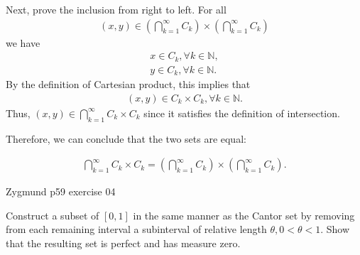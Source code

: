 \documentclass[UTF8,a4paper,10pt]{article}
\begin{document}
\begin{solution}
    Next, prove the inclusion from right to left. For all
    \begin{equation*}
      \begin{aligned}
          (x,y)\in \left(\bigcap_{k=1}^{\infty} C_k\right) \times \left(\bigcap_{k=1}^{\infty} C_k\right)
      \end{aligned}
    \end{equation*}
    we have
    \begin{equation*}
      \begin{aligned}
        x\in C_k, \forall k \in \mathbb{N},\\
        y\in C_k, \forall k \in \mathbb{N}.
      \end{aligned}
    \end{equation*}
    By the definition of Cartesian product, this implies that
    \begin{equation*}
      \begin{aligned}
        (x,y)\in C_k \times C_k, \forall k \in \mathbb{N}.
      \end{aligned}
    \end{equation*}
    Thus, \((x,y)\in \bigcap_{k=1}^{\infty} C_k \times C_k \)  since it satisfies the definition of intersection.

    Therefore, we can conclude that the two sets are equal:

    \begin{equation*}
      \begin{aligned}
        \bigcap_{k=1}^{\infty} C_k \times C_k =  \left(\bigcap_{k=1}^{\infty} C_k\right) \times \left(\bigcap_{k=1}^{\infty} C_k\right) .
      \end{aligned}
    \end{equation*}




 

  \end{solution}
  
  \pagebreak


  \begin{Problem}[]{Zygmund p59 exercise 04}

    Construct a subset of $[0, 1]$ in the same manner as the Cantor set by
    removing from each remaining interval a subinterval of relative length
    $\theta, 0 < \theta < 1$. Show that the resulting set is perfect and has measure zero.
  
  \end{Problem}
\end{document}

